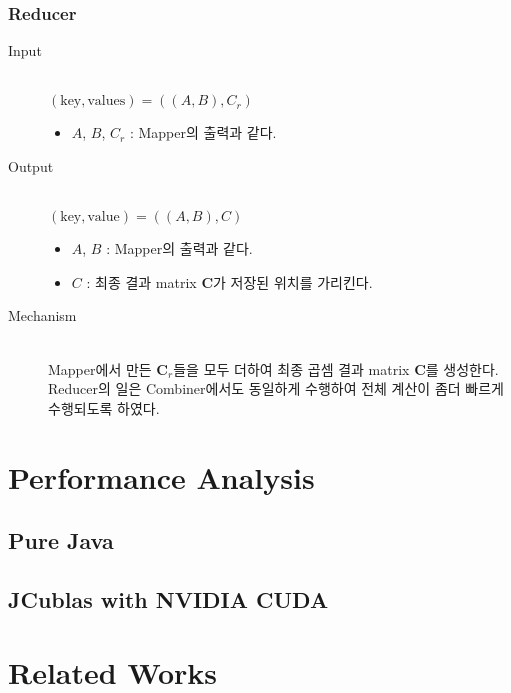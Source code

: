 \documentclass[a4paper]{article}
\begin{document}
\begin{multicols}{2}
\subsubsection{Reducer}
\begin{description}
	\item[Input] \hfill \\
	$(\text{key}, \text{values}) = ((A, B), C_r)$
	\begin{itemize}
		\item $A$, $B$, $C_r$ : Mapper의 출력과 같다.
	\end{itemize}
	\item[Output] \hfill \\
	$(\text{key}, \text{value}) = ((A, B), C)$
	\begin{itemize}
		\item $A$, $B$ : Mapper의 출력과 같다. 
		\item $C$ : 최종 결과 matrix $\mathbf{C}$가 저장된 위치를 가리킨다.
	\end{itemize}
	\item[Mechanism] \hfill \\
	Mapper에서 만든 $\mathbf{C}_r$들을 모두 더하여 최종 곱셈 결과 matrix $\mathbf{C}$를 생성한다.
	Reducer의 일은 Combiner에서도 동일하게 수행하여 전체 계산이 좀더 빠르게 수행되도록 하였다.
\end{description}

\section{Performance Analysis}
\subsection{Pure Java}
\subsection{JCublas with NVIDIA CUDA}

\section{Related Works}

\end{multicols}
\end{document}
